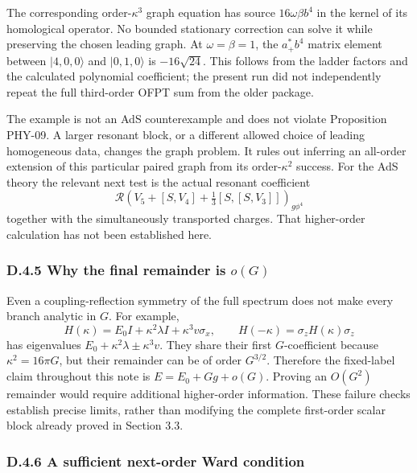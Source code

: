 \documentclass[a4paper,11pt]{article}
\numberwithin{equation}{section}
\begin{document}
The corresponding order-\(\kappa^3\) graph equation has source \(16\omega\beta b^4\) in the kernel of its homological operator. No bounded stationary correction can solve it while preserving the chosen leading graph. At \(\omega=\beta=1\), the \(a_+^*b^4\) matrix element between \(|4,0,0\rangle\) and \(|0,1,0\rangle\) is \(-16\sqrt{24}\). This follows from the ladder factors and the calculated polynomial coefficient; the present run did not independently repeat the full third-order OFPT sum from the older package.

The example is not an AdS counterexample and does not violate Proposition PHY-09. A larger resonant block, or a different allowed choice of leading homogeneous data, changes the graph problem. It rules out inferring an all-order extension of this particular paired graph from its order-\(\kappa^2\) success. For the AdS theory the relevant next test is the actual resonant coefficient \[
\mathcal R\left(V_5+[S,V_4]+\tfrac13[S,[S,V_3]]\right)_{g\phi^4}
\tag{D.22}
\] together with the simultaneously transported charges. That higher-order calculation has not been established here.

\hypertarget{d.4.5-why-the-final-remainder-is-og}{%
\subsubsection{\texorpdfstring{D.4.5 Why the final remainder is \(o(G)\)}{D.4.5 Why the final remainder is o(G)}}\label{d.4.5-why-the-final-remainder-is-og}}

Even a coupling-reflection symmetry of the full spectrum does not make every branch analytic in \(G\). For example, \[
H(\kappa)=E_0I+\kappa^2\lambda I+\kappa^3v\sigma_x,
\qquad
H(-\kappa)=\sigma_zH(\kappa)\sigma_z
\tag{D.23}
\] has eigenvalues \(E_0+\kappa^2\lambda\pm\kappa^3v\). They share their first \(G\)-coefficient because \(\kappa^2=16\pi G\), but their remainder can be of order \(G^{3/2}\). Therefore the fixed-label claim throughout this note is \(E=E_0+Gg+o(G)\). Proving an \(O(G^2)\) remainder would require additional higher-order information. These failure checks establish precise limits, rather than modifying the complete first-order scalar block already proved in Section 3.3.

\hypertarget{d.4.6-a-sufficient-next-order-ward-condition}{%
\subsubsection{D.4.6 A sufficient next-order Ward condition}\label{d.4.6-a-sufficient-next-order-ward-condition}}
\end{document}

